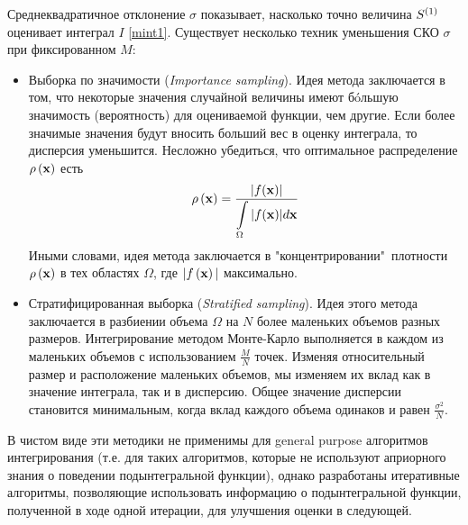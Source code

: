 Среднеквадратичное отклонение $\sigma$ показывает, насколько точно величина $S^{\left( 1 \right)}$ оценивает интеграл $I$ \eqref{mint1}. Существует несколько техник уменьшения СКО $\sigma$ при фиксированном $M$:
\begin{itemize}
\item Выборка по значимости (\textit{Importance sampling}). Идея метода заключается в том, что некоторые значения случайной величины имеют б\'{o}льшую значимость (вероятность) для оцениваемой функции, чем другие. Если более значимые значения будут вносить больший вес в оценку интеграла, то дисперсия уменьшится. Несложно убедиться, что оптимальное распределение $\rho \left( \mathbf{x} \right)$  есть
\vverh
\begin{gather}
\rho \left( \mathbf{x} \right) = \frac{\displaystyle | f(\mathbf{x}) |}{\displaystyle \int\limits_{\Omega} |f(\mathbf{x})| d \mathbf{x}} \notag
\end{gather} 
Иными словами, идея метода заключается в "концентрировании"\ плотности $\rho \left( \mathbf{x} \right)$ в тех областях $\Omega$, где $| f \left( \mathbf{x} \right) |$ максимально. 
\item Стратифицированная выборка (\textit{Stratified sampling}). Идея этого метода заключается в разбиении объема $\Omega$ на $N$ более маленьких объемов разных размеров. Интегрирование методом Монте-Карло выполняется в каждом из маленьких объемов с использованием $\frac{M}{N}$ точек. Изменяя относительный размер и расположение маленьких объемов, мы изменяем их вклад как в значение интеграла, так и в дисперсию. Общее значение дисперсии становится минимальным, когда вклад каждого объема одинаков и равен $\frac{\sigma^2}{N}$.  
\end{itemize} 

В чистом виде эти методики не применимы для general purpose алгоритмов интегрирования (т.е. для таких алгоритмов, которые не используют априорного знания о поведении подынтегральной функции), однако разработаны итеративные алгоритмы, позволяющие использовать информацию о подынтегральной функции, полученной в ходе одной итерации, для улучшения оценки в следующей. \cite{lepage1978, tsuda1973, haselgrove1961}
